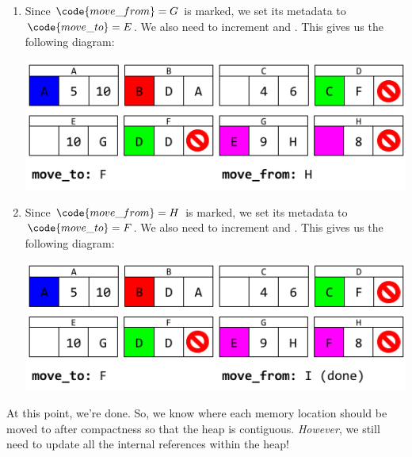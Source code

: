 \documentclass[letterpaper]{article}
\begin{document}
\begin{enumerate}
    \item Since $\code{move\_from} = G$ is marked, we set its metadata to $\code{move\_to} = E$. We also need to increment  and . This gives us the following diagram: 
    \begin{center}
        \includegraphics[scale=0.6]{../assets/GCAlg3_7.png}
    \end{center}

    \item Since $\code{move\_from} = H$ is marked, we set its metadata to $\code{move\_to} = F$. We also need to increment  and . This gives us the following diagram: 
    \begin{center}
        \includegraphics[scale=0.6]{../assets/GCAlg3_8.png}
    \end{center}
\end{enumerate}
At this point, we're done. So, we know where each memory location should be moved to after compactness so that the heap is contiguous. \emph{However}, we still need to update all the internal references within the heap!
\end{document}
